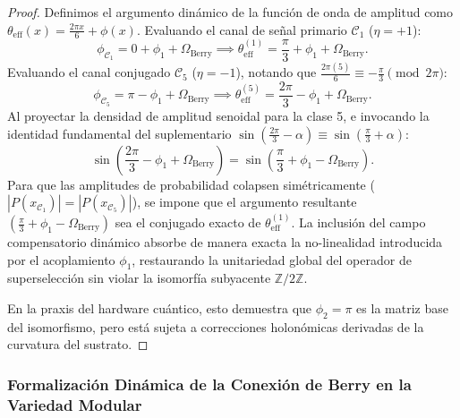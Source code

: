 \documentclass[12pt,a4paper]{article}
\theoremstyle{plain}
\theoremstyle{definition}
\theoremstyle{remark}
\begin{document}
\begin{proof}
Definimos el argumento dinámico de la función de onda de amplitud como $\theta_{\text{eff}}(x) = \frac{2\pi x}{6} + \phi(x)$. 
Evaluando el canal de señal primario $\mathcal{C}_1$ ($\eta = +1$):
\begin{equation}
    \phi_{\mathcal{C}_1} = 0 + \phi_1 + \Omega_{\text{Berry}} \implies \theta_{\text{eff}}^{(1)} = \frac{\pi}{3} + \phi_1 + \Omega_{\text{Berry}}.
\end{equation}
Evaluando el canal conjugado $\mathcal{C}_5$ ($\eta = -1$), notando que $\frac{2\pi(5)}{6} \equiv -\frac{\pi}{3} \pmod{2\pi}$:
\begin{equation}
    \phi_{\mathcal{C}_5} = \pi - \phi_1 + \Omega_{\text{Berry}} \implies \theta_{\text{eff}}^{(5)} = \frac{2\pi}{3} - \phi_1 + \Omega_{\text{Berry}}.
\end{equation}
Al proyectar la densidad de amplitud senoidal para la clase 5, e invocando la identidad fundamental del suplementario $\sin(\frac{2\pi}{3} - \alpha) \equiv \sin(\frac{\pi}{3} + \alpha)$:
\begin{equation}
    \sin\left(\frac{2\pi}{3} - \phi_1 + \Omega_{\text{Berry}}\right) = \sin\left(\frac{\pi}{3} + \phi_1 - \Omega_{\text{Berry}}\right).
\end{equation}
Para que las amplitudes de probabilidad colapsen simétricamente ($|P(x_{\mathcal{C}_1})| = |P(x_{\mathcal{C}_5})|$), se impone que el argumento resultante $(\frac{\pi}{3} + \phi_1 - \Omega_{\text{Berry}})$ sea el conjugado exacto de $\theta_{\text{eff}}^{(1)}$. La inclusión del campo compensatorio dinámico absorbe de manera exacta la no-linealidad introducida por el acoplamiento $\phi_1$, restaurando la unitariedad global del operador de superselección sin violar la isomorfía subyacente $\mathbb{Z}/2\mathbb{Z}$. 

En la praxis del hardware cuántico, esto demuestra que $\phi_2 = \pi$ es la matriz base del isomorfismo, pero está sujeta a correcciones holonómicas derivadas de la curvatura del sustrato.
\end{proof}


\subsubsection*{Formalización Dinámica de la Conexión de Berry en la Variedad Modular}
\label{subsubsec:berry_formalism}
\end{document}
